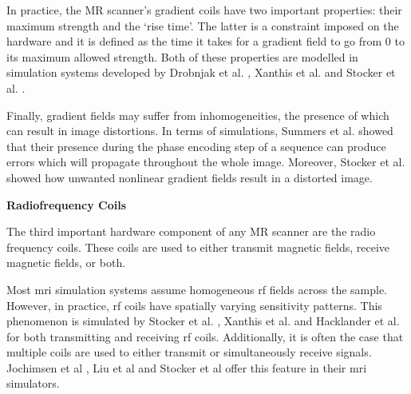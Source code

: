 \hfill

In practice, the MR scanner's gradient coils have two important properties: their maximum strength and the `rise time'.
The latter is a constraint imposed on the hardware and it is defined as the time it takes for a gradient field to go from 0 to its maximum allowed strength.
Both of these properties are modelled in simulation systems developed by Drobnjak et al. \cite{Drobnjak2006}, Xanthis et al. \cite{Xanthis2014} and Stocker et al. \cite{Stocker2010}.

\hfill

Finally, gradient fields may suffer from inhomogeneities, the presence of which can result in image distortions.
In terms of simulations, Summers et al. \cite{Summers1986} showed that their presence during the phase encoding step of a sequence can produce errors which will propagate throughout the whole image.
Moreover, Stocker et al. \cite{Stocker2010} showed how unwanted nonlinear gradient fields result in a distorted image.

\hfill

\large \textbf{Radiofrequency Coils} \normalsize

The third important hardware component of any MR scanner are the radio frequency coils.
These coils are used to either transmit magnetic fields, receive magnetic fields, or both.

\hfill

Most \ac{mri} simulation systems assume homogeneous \ac{rf} fields across the sample.
However, in practice, \ac{rf} coils have spatially varying sensitivity patterns.
This phenomenon is simulated by Stocker et al. \cite{Stocker2010}, Xanthis et al. \cite{Xanthis2014} and Hacklander et al. \cite{Hacklander2005} for both transmitting and receiving \ac{rf} coils.
Additionally, it is often the case that multiple coils are used to either transmit or simultaneously receive signals.
Jochimsen et al \cite{Jochimsen2004}, Liu et al \cite{Liu2014} and Stocker et al \cite{Stocker2010} offer this feature in their \ac{mri} simulators.

